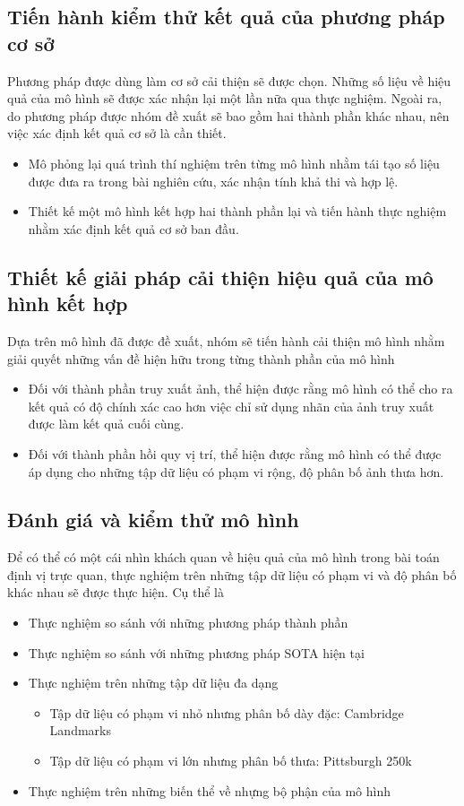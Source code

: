 \subsection{Tiến hành kiểm thử kết quả của phương pháp cơ sở}
Phương pháp được dùng làm cơ sở cải thiện sẽ được chọn. Những số liệu về hiệu quả của mô hình sẽ được xác nhận lại một lần nữa qua thực nghiệm. Ngoài ra, do phương pháp được nhóm đề xuất sẽ bao gồm hai thành phần khác nhau, nên việc xác định kết quả cơ sở là cần thiết.
\begin{itemize}
    \item Mô phỏng lại quá trình thí nghiệm trên từng mô hình nhằm tái tạo số liệu được đưa ra trong bài nghiên cứu, xác nhận tính khả thi và hợp lệ.
    \item Thiết kế một mô hình kết hợp hai thành phần lại và tiến hành thực nghiệm nhằm xác định kết quả cơ sở ban đầu.
\end{itemize}

\subsection{Thiết kế giải pháp cải thiện hiệu quả của mô hình kết hợp}
Dựa trên mô hình đã được đề xuất, nhóm sẽ tiến hành cải thiện mô hình nhằm giải quyết những vấn đề hiện hữu trong từng thành phần của mô hình
\begin{itemize}
    \item Đối với thành phần truy xuất ảnh, thể hiện được rằng mô hình có thể cho ra kết quả có độ chính xác cao hơn việc chỉ sử dụng nhãn của ảnh truy xuất được làm kết quả cuối cùng.
    \item Đối với thành phần hồi quy vị trí, thể hiện được rằng mô hình có thể được áp dụng cho những tập dữ liệu có phạm vi rộng, độ phân bố ảnh thưa hơn.
\end{itemize}

\subsection{Đánh giá và kiểm thử mô hình}
Để có thể có một cái nhìn khách quan về hiệu quả của mô hình trong bài toán định vị trực quan, thực nghiệm trên những tập dữ liệu có phạm vi và độ phân bố khác nhau sẽ được thực hiện. Cụ thể là

\begin{itemize}
    \item Thực nghiệm so sánh với những phương pháp thành phần
    \item Thực nghiệm so sánh với những phương pháp SOTA hiện tại
    \item Thực nghiệm trên những tập dữ liệu đa dạng
    \begin{itemize}
        \item Tập dữ liệu có phạm vi nhỏ nhưng phân bố dày đặc: Cambridge Landmarks
        \item Tập dữ liệu có phạm vi lớn nhưng phân bố thưa: Pittsburgh 250k
    \end{itemize}
    \item Thực nghiệm trên những biến thể về nhựng bộ phận của mô hình
\end{itemize}

